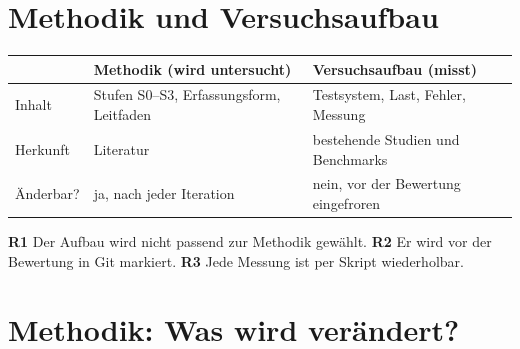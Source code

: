 \documentclass[11pt, a4paper]{article}
\begin{document}
\section{Methodik und Versuchsaufbau}\label{sec:trennung}

\begin{center}
\small
\begin{tabularx}{\textwidth}{@{}l X X@{}}
\toprule
 & \textbf{Methodik} (wird untersucht) & \textbf{Versuchsaufbau} (misst) \\
\midrule
Inhalt & Stufen S0--S3, Erfassungsform, Leitfaden & Testsystem, Last, Fehler, Messung \\
Herkunft & Literatur & bestehende Studien und Benchmarks \\
Änderbar? & ja, nach jeder Iteration & nein, vor der Bewertung eingefroren \\
\bottomrule
\end{tabularx}
\end{center}

\textbf{R1} Der Aufbau wird nicht passend zur Methodik gewählt. \textbf{R2} Er wird vor der Bewertung in Git markiert. \textbf{R3} Jede Messung ist per Skript wiederholbar.

\section{Methodik: Was wird verändert?}\label{sec:methodik}
\end{document}
